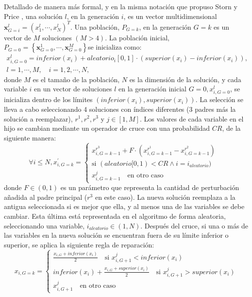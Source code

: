 Detallado de manera más formal, y en la misma notación que propuso Storn
y Price \cite{Storn1997}, una solución $l$, en la generación $i$, es un vector
multidimensional $\displaystyle \mathbf{x}_{G=i}^l =
\left(x_{1}^l,\cdots,x_{N}^l\right)^T$. Una población, $P_{G=k}$, en la generación $G=k$ es un
vector de $M$ soluciones $(M>4)$. La población inicial, $P_{G=0}=\left\lbrace
\mathbf{x}_{G=0}^1,\cdots,\mathbf{x}_{G=0}^M\right\rbrace $se inicializa como:
\begin{gather}\nonumber
	x_{i,G=0}^l = inferior(x_{i})+aleatorio_{i}[0,1]\cdot(superior(x_{i})-inferior(x_{i})), \nonumber
\\
		l=1,\cdots,M, \quad i= 1,2,\cdots,N, \nonumber
\end{gather}
donde $M$ es el tamaño de la población, $N$ es la dimensión de la solución, y cada variable
$i$ en un vector de soluciones $l$ en la generación inicial $\displaystyle G=0,x_{i,G=0}^l$, se
inicializa dentro de los límites $\displaystyle (inferior(x_{i}),superior(x_{i}))$. La selección
se lleva a cabo seleccionando 4 soluciones con índices diferentes (3 padres más la solución a
reemplazar), $r^1, r^2, r^3$ y $j\in [1,M]$. Los valores de cada variable en el hijo se cambian
mediante un operador de cruce con una probabilidad $CR$, de la siguiente manera:
\begin{equation}
				\forall i \leq N,x_{i,G=k}^{'}= \left\lbrace
				\begin{array}{ll}\nonumber
			   x_{i,G=k-1}^{r^3} + F\cdot (x_{i,G=k-1}^{r^1} - x_{i,G=k-1}^{r^2}) & \\
			   \mbox{si $(aleatorio[0,1)< CR \wedge i=i_{aleatorio})$} \\
            x_{i,G=k-1}^{j} \quad \mbox{en otro caso}
            \end{array}
            \right.
\end{equation}
donde $F\in(0,1)$ es un parámetro que representa la cantidad de perturbación añadida al padre
principal ($r^3$ en este caso). La nueva solución reemplaza a la antigua seleccionada si es mejor
que ella, y al menos una de las variables se debe cambiar. Esta última está representada en el
algoritmo de forma aleatoria, seleccionando una variable, $\displaystyle i_{aleatorio}\in(1,N)$.
Después del cruce, si una o más de las variables en la nueva solución se encuentran fuera de su
límite inferior o superior, se aplica la siguiente regla de reparación:
\begin{equation}
				x_{i,G=k}= \left\lbrace
				\begin{array}{ll}\nonumber
			   \frac{x_{i,G}+inferior(x_{i})}{2}  \quad \text{si $x_{i,G+1}^j < inferior(x_{i})$} \\
            inferior(x_{i}) + \frac{x_{i,G}+superior(x_{i})}{2} \quad \text{si $x_{i,G+1}^j>
superior(x_{i})$} \\
            x_{i,G+1}^j \quad \text{en otro caso}
            \end{array}
            \right.
\end{equation}

